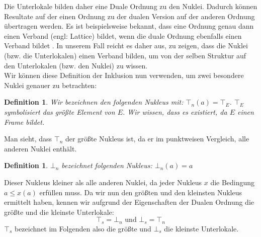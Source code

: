 \documentclass{article}
\newtheorem{definition}[satz]{Definition}
\begin{document}
Die Unterlokale bilden daher eine Duale Ordnung zu den Nuklei. \autocite[S. 51]{johnstone_stone_1982} \autocite{noauthor_categorydual_nodate}%
Dadurch können Resultate auf der einen Ordnung zu der dualen Version auf der anderen Ordnung übertragen werden. Es ist beispielsweise bekannt, dass eine Ordnung genau dann einen Verband (engl: Lattice) bildet, wenn die duale Ordnung ebenfalls einen Verband \autocite{noauthor_verband_2024} bildet \autocite{noauthor_dual_nodate}. %
In unserem Fall reicht es daher aus, zu zeigen, dass die Nuklei (bzw. die Unterlokalen) einen Verband bilden, um von der selben Struktur auf den Unterlokalen (bzw. den Nuklei) zu wissen. \\
Wir können diese Definition der Inklusion nun verwenden, um zwei besondere Nuklei genauer zu betrachten:
\begin{definition}
    Wir bezeichnen den folgenden Nukleus mit: $\top_n (a) = \top_E$. $\top_E$ symbolisiert das größte Element von $E$. Wir wissen, dass es existiert, da $E$ einen Frame bildet.
\end{definition}
Man sieht, dass $\top_n$ der größte Nukleus ist, da er im punktweisen Vergleich, alle anderen Nuklei enthält.
\begin{definition}
    $\bot_n$ bezeichnet folgenden Nukleus: $\bot_n (a) = a$
\end{definition}
Dieser Nukleus \glqq kleiner \grqq{} als alle anderen Nuklei, da jeder Nukleus $x$ die Bedingung $a \le x(a)$ erfüllen muss. Da wir nun den größten und den kleinsten Nukleus ermittelt haben, kennen wir aufgrund der Eigenschaften der Dualen Ordnung die größte und die kleinste Unterlokale:
$$\top_s = \bot_n \text{ und } \bot_s = \top_n$$
$\top_s$ bezeichnet im Folgenden also die größte und $\bot_s$ die kleinste Unterlokale.

\end{document}
